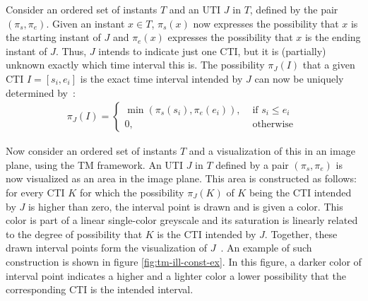 Consider an ordered set of instants $T$ and an UTI $J$ in $T$, defined by the pair $(\pi_s, \pi_e)$. Given an instant $x \in T$, $\pi_s(x)$ now expresses the possibility that $x$ is the starting instant of $J$ and $\pi_e(x)$ expresses the possibility that $x$ is the ending instant of $J$. Thus, $J$ intends to indicate just one CTI, but it is (partially) unknown exactly which time interval this is. The possibility $\pi_J(I)$ that a given CTI $I = \left[s_i, e_i\right]$ is the exact time interval intended by $J$ can now be uniquely determined by~\cite{DeTre2012}:
\vspace{-5pt}
\begin{align}
\pi_J(I) = \begin{cases}
 \min \left(\pi_s (s_i), \pi_e (e_i) \right), & \mbox{ if } s_i \leq e_i\\
0, & \mbox{ otherwise }
\end{cases}
\end{align}

Now consider an ordered set of instants $T$ and a visualization of this in an image plane, using the TM framework. An UTI $J$ in $T$ defined by a pair $(\pi_s, \pi_e)$ is now visualized as an area in the image plane. This area is constructed as follows: for every CTI $K$ for which the possibility $\pi_J(K)$ of $K$ being the CTI intended by $J$ is higher than zero, the interval point is drawn and is given a color. This color is part of a linear single-color greyscale and its saturation is linearly related to the degree of possibility that $K$ is the CTI intended by $J$. Together, these drawn interval points form the visualization of $J$~\cite{DeTre2012}. An example of such construction is shown in figure \ref{fig:tm-ill-const-ex}. In this figure, a darker color of interval point indicates a higher and a lighter color a lower possibility that the corresponding CTI is the intended interval.

